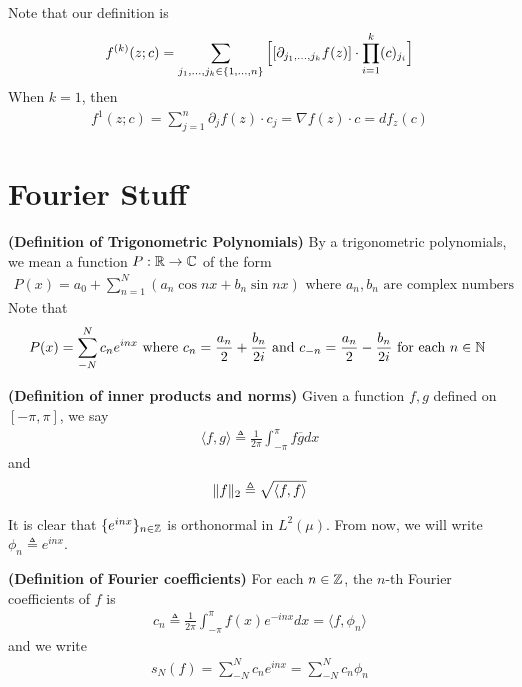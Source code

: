 \documentclass{report}
\begin{document}
\begin{mdframed}
Note that our definition is 
\begin{align*}
f^{(k)}(z;c)= \sum_{j_1,\dots ,j_k \in \{ 1,\dots ,n \}} \Big[ [\partial_{j_1,\dots ,j_k}f(z)]\cdot \prod_{i=1}^k (c)_{j_i} \Big]
\end{align*}
When  $k=1$, then 
 \begin{align*}
f^{1}(z;c)=\sum_{j=1}^n \partial_j f(z)\cdot c_j = \nabla f(z)\cdot c = df_z(c)
\end{align*}
\end{mdframed}
\section{Fourier Stuff}
\begin{definition}
\textbf{(Definition of Trigonometric Polynomials)} By a trigonometric polynomials, we mean a function $P:\mathbb{R}\rightarrow \mathbb{C}$ of the form 
\begin{align*}
P(x)=a_0 + \sum_{n=1}^N (a_n \cos nx + b_n \sin nx)\text{ where $a_n,b_n$ are complex numbers }
\end{align*}
Note that 
\begin{align*}
P(x)=\sum_{-N}^N c_n e^{inx}\text{ where }c_n = \frac{a_n}{2}+ \frac{b_n}{2i}\text{ and }c_{-n} =\frac{a_n}{2}- \frac{b_n}{2i}\text{ for each $n\in\mathbb{N}$ }
\end{align*}
\end{definition}
\begin{definition}
\textbf{(Definition of inner products and norms)} Given a function $f,g$ defined on $[-\pi,\pi]$, we say 
\begin{align*}
 \langle f,g\rangle \triangleq \frac{1}{2\pi}\int_{-\pi}^{\pi} f\overline{g}dx
\end{align*}
and 
\begin{align*}
\| f \|_2\triangleq \sqrt{\langle f,f\rangle } 
\end{align*}
\end{definition}
\begin{mdframed}
It is clear that $\{ e^{inx} \}_{n\in\mathbb{Z}}$ is orthonormal in $L^2(\mu)$. From now, we will write $\phi_n\triangleq  e^{inx}$.
\end{mdframed}
\begin{definition}
\textbf{(Definition of Fourier coefficients)} For each $n\in\mathbb{Z}$, the $n$-th Fourier coefficients of $f$ is 
\begin{align*}
c_n\triangleq \frac{1}{2\pi} \int_{-\pi}^{\pi} f(x)e^{-inx}dx= \langle f,\phi_n\rangle 
\end{align*}
and we write 
\begin{align*}
s_N(f)=\sum_{-N}^N c_ne^{inx}=\sum_{-N}^{N}c_n\phi_n
\end{align*}
\end{definition}
\end{document}
